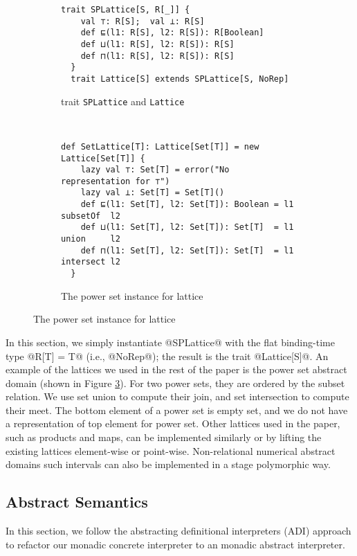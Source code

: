 \begin{figure}[h!]
  \centering
  \begin{subfigure}[b]{0.45\textwidth}
  \begin{lstlisting}[style=small]
  trait SPLattice[S, R[_]] {
    val ⊤: R[S];  val ⊥: R[S]
    def ⊑(l1: R[S], l2: R[S]): R[Boolean]
    def ⊔(l1: R[S], l2: R[S]): R[S]
    def ⊓(l1: R[S], l2: R[S]): R[S]
  }
  trait Lattice[S] extends SPLattice[S, NoRep]
  \end{lstlisting}
  \caption{trait \texttt{SPLattice} and \texttt{Lattice}} \label{fig:splattice}
  \end{subfigure}
  ~
  \begin{subfigure}[b]{0.6\textwidth}
\begin{lstlisting}[style=small]
  def SetLattice[T]: Lattice[Set[T]] = new Lattice[Set[T]] {
    lazy val ⊤: Set[T] = error("No representation for ⊤")
    lazy val ⊥: Set[T] = Set[T]()
    def ⊑(l1: Set[T], l2: Set[T]): Boolean = l1 subsetOf  l2
    def ⊔(l1: Set[T], l2: Set[T]): Set[T]  = l1 union     l2
    def ⊓(l1: Set[T], l2: Set[T]): Set[T]  = l1 intersect l2
  }
\end{lstlisting}
  \caption{The power set instance for lattice} \label{fig:powerset}
\end{subfigure}
\end{figure}

In this section, we simply instantiate @SPLattice@ with the flat binding-time
type @R[T] = T@ (i.e., @NoRep@); the result is the trait @Lattice[S]@.
An example of the lattices we used in the rest of the paper is the power set
abstract domain (shown in Figure \ref{fig:powerset}). For two power sets,
they are ordered by the subset relation. We use set union to compute their
join, and set intersection to compute their meet.  The bottom element of a
power set is empty set, and we do not have a representation of top element for
power set.  Other lattices used in the paper, such as products and maps, can be
implemented similarly or by lifting the existing lattices element-wise or
point-wise.  Non-relational numerical abstract domains such intervals can also
be implemented in a stage polymorphic way.

\subsection{Abstract Semantics}

In this section, we follow the abstracting definitional interpreters
(ADI) approach \cite{DBLP:journals/pacmpl/DaraisLNH17} to refactor our monadic
concrete interpreter to an monadic abstract interpreter.

